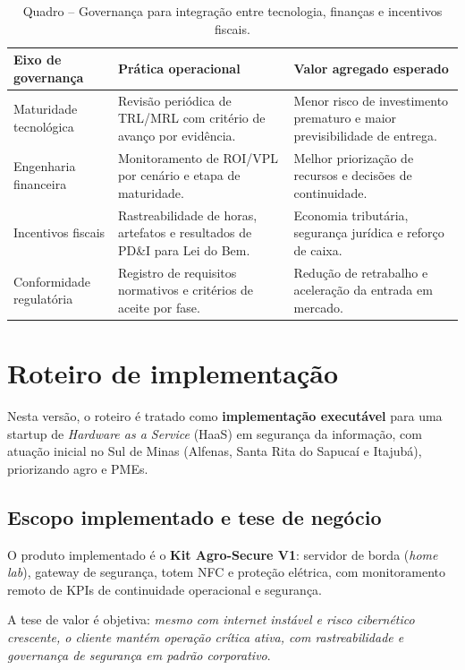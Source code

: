 \begin{table}[htb]
\centering
\caption{Quadro -- Governança para integração entre tecnologia, finanças e incentivos fiscais.}
\label{qua:governanca-integrada}
\begin{tabular}{|p{}|p{}|p{}|}
\hline
\textbf{Eixo de governança} & \textbf{Prática operacional} & \textbf{Valor agregado esperado} \\
\hline
Maturidade tecnológica & Revisão periódica de TRL/MRL com critério de avanço por evidência. & Menor risco de investimento prematuro e maior previsibilidade de entrega. \\
\hline
Engenharia financeira & Monitoramento de ROI/VPL por cenário e etapa de maturidade. & Melhor priorização de recursos e decisões de continuidade. \\
\hline
Incentivos fiscais & Rastreabilidade de horas, artefatos e resultados de PD\&I para Lei do Bem. & Economia tributária, segurança jurídica e reforço de caixa. \\
\hline
Conformidade regulatória & Registro de requisitos normativos e critérios de aceite por fase. & Redução de retrabalho e aceleração da entrada em mercado. \\
\hline
\end{tabular}
\end{table}

\section{Roteiro de implementação}

Nesta versão, o roteiro é tratado como \textbf{implementação executável} para uma startup de \textit{Hardware as a Service} (HaaS) em segurança da informação, com atuação inicial no Sul de Minas (Alfenas, Santa Rita do Sapucaí e Itajubá), priorizando agro e PMEs.

\subsection{Escopo implementado e tese de negócio}

O produto implementado é o \textbf{Kit Agro-Secure V1}: servidor de borda (\textit{home lab}), gateway de segurança, totem NFC e proteção elétrica, com monitoramento remoto de KPIs de continuidade operacional e segurança.

A tese de valor é objetiva: \textit{mesmo com internet instável e risco cibernético crescente, o cliente mantém operação crítica ativa, com rastreabilidade e governança de segurança em padrão corporativo}.

